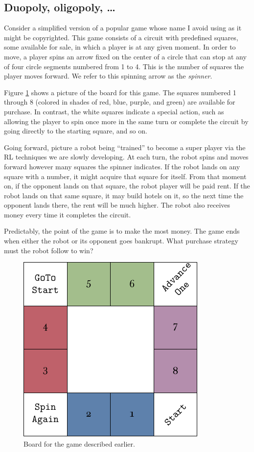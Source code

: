 \subsection{Duopoly, oligopoly, \ldots}
Consider a simplified version of a popular game whose name I avoid using as it
might be copyrighted. This game consists of a circuit with predefined squares,
some available for sale, in which a player is at any given moment. In order to
move, a player spins an arrow fixed on the center of a circle that can stop at
any of four circle segments numbered from 1 to 4. This is the number of squares
the player moves forward. We refer to this spinning arrow as the
\textit{spinner}.

Figure \ref{fig:miniopoly-board} shows a picture of the board for this game. The
squares numbered 1 through 8 (colored in shades of red, blue, purple, and green)
are available for purchase. In contrast, the white squares indicate a special
action, such as allowing the player to spin once more in the same turn or
complete the circuit by going directly to the starting square, and so on.

Going forward, picture a robot being ``trained'' to become a super player via
the RL techniques we are slowly developing. At each turn, the robot spins and
moves forward however many squares the spinner indicates. If the robot lands on
any square with a number, it might acquire that square for itself. From that
moment on, if the opponent lands on that square, the robot player will be paid
rent. If the robot lands on that same square, it may build hotels on it, so the
next time the opponent lands there, the rent will be much higher. The robot also
receives money every time it completes the circuit.

Predictably, the point of the game is to make the most money. The game ends when
either the robot or its opponent goes bankrupt. What purchase strategy must the
robot follow to win?
\begin{figure}[h]
	\centering
	\includegraphics[width=.65\textwidth]{img/board.pdf}
	\caption{Board for the game described earlier.}
	\label{fig:miniopoly-board}
\end{figure}

